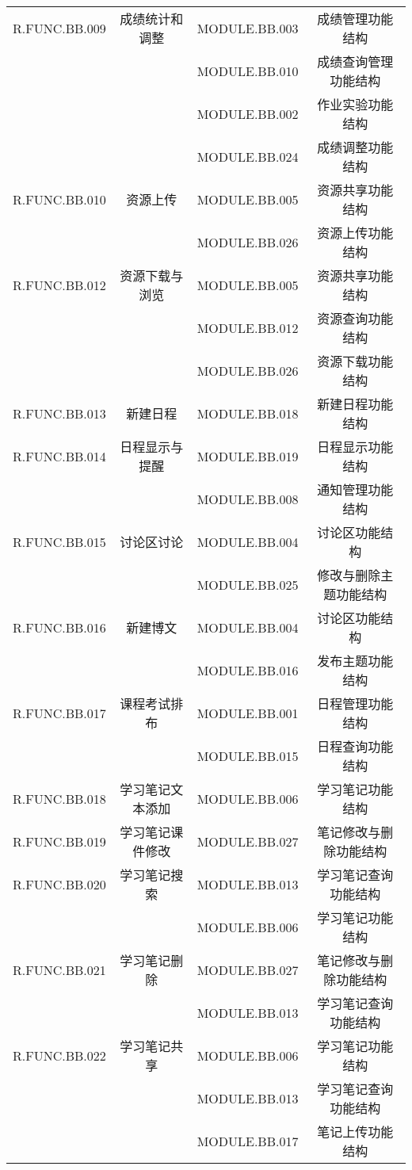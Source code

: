 \begin{longtable}{|c|c|c|c|}
R.FUNC.BB.009   &   成绩统计和调整   &    MODULE.BB.003   &   成绩管理功能结构     \\
    &   &   MODULE.BB.010   &   成绩查询管理功能结构  \\
    &   &   MODULE.BB.002  &  作业实验功能结构  \\
    &   &   MODULE.BB.024   & 成绩调整功能结构  \\

R.FUNC.BB.010   &   资源上传   &    MODULE.BB.005   &   资源共享功能结构   \\
    &   &   MODULE.BB.026  &  资源上传功能结构  \\

R.FUNC.BB.012   &   资源下载与浏览   &   MODULE.BB.005   &   资源共享功能结构   \\
    &   &   MODULE.BB.012  &  资源查询功能结构  \\
    &   &   MODULE.BB.026  &  资源下载功能结构  \\

R.FUNC.BB.013   &   新建日程   &   MODULE.BB.018   &   新建日程功能结构   \\

R.FUNC.BB.014   &   日程显示与提醒   &   MODULE.BB.019  &  日程显示功能结构   \\
    &   &   MODULE.BB.008  &  通知管理功能结构 \\

R.FUNC.BB.015   &   讨论区讨论   &  MODULE.BB.004   & 讨论区功能结构   \\
    &   &   MODULE.BB.025  &  修改与删除主题功能结构\\

R.FUNC.BB.016   &   新建博文   &   MODULE.BB.004  &  讨论区功能结构   \\
    &   &   MODULE.BB.016  &  发布主题功能结构  \\

R.FUNC.BB.017   &   课程考试排布   &   MODULE.BB.001  &  日程管理功能结构   \\
    &   &   MODULE.BB.015  &  日程查询功能结构  \\

R.FUNC.BB.018   &   学习笔记文本添加   &   MODULE.BB.006  &  学习笔记功能结构    \\

R.FUNC.BB.019   &   学习笔记课件修改   &   MODULE.BB.027  &  笔记修改与删除功能结构   \\

R.FUNC.BB.020   &   学习笔记搜索   &   MODULE.BB.013  &  学习笔记查询功能结构   \\
    &   &   MODULE.BB.006  &  学习笔记功能结构    \\

R.FUNC.BB.021   &   学习笔记删除   &   MODULE.BB.027  &  笔记修改与删除功能结构   \\
    &   &   MODULE.BB.013  &  学习笔记查询功能结构   \\

R.FUNC.BB.022   &   学习笔记共享   &   MODULE.BB.006  &  学习笔记功能结构 \\
    &   &   MODULE.BB.013  &  学习笔记查询功能结构   \\
    &   &   MODULE.BB.017  &  笔记上传功能结构  \\



\end{longtable}

